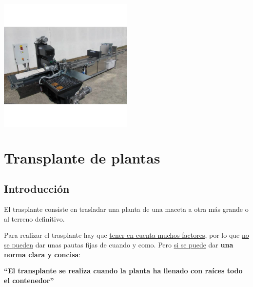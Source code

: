 \documentclass[a4paper,12pt,oneside]{article}
\begin{document}
\begin{center}
\includegraphics[width=0.5\textwidth]{./img_uf1596/sembradora_bandejas.png}
\end{center}
\section{Transplante de plantas}
\label{sec:orgae92dc5}
\subsection{Introducción}
\label{sec:orgc140aa6}
El trasplante consiste en trasladar una planta de una maceta a otra más grande
o al terreno definitivo.

Para realizar el trasplante hay que \uline{tener en cuenta muchos factores}, por lo
que \uline{no se pueden} dar unas pautas fijas de cuando y como. Pero \uline{si se puede}
dar \textbf{una norma clara y concisa}:
\begin{center}
\textbf{``El transplante se realiza cuando la planta ha llenado con raíces todo el
 contenedor''} 
\end{center}
\end{document}
